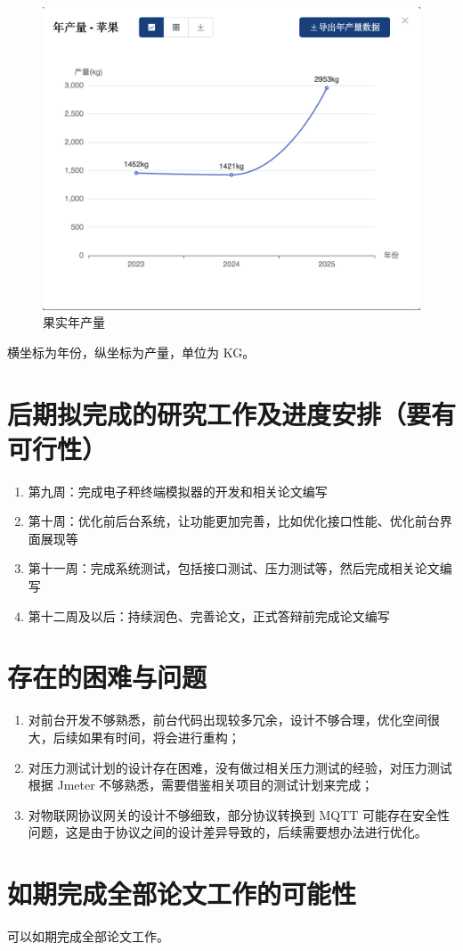 \documentclass{xduugmr}
\begin{document}
\begin{figure}[H]
    \centering
    \includegraphics[width=0.8\linewidth]{../result/果实年产量.png}
    \caption{果实年产量}
    \label{fig:果实年产量}
\end{figure}

横坐标为年份，纵坐标为产量，单位为 KG。

\section{后期拟完成的研究工作及进度安排（要有可行性）}

\begin{enumerate}
    \item 第九周：完成电子秤终端模拟器的开发和相关论文编写
    \item 第十周：优化前后台系统，让功能更加完善，比如优化接口性能、优化前台界面展现等
    \item 第十一周：完成系统测试，包括接口测试、压力测试等，然后完成相关论文编写
    \item 第十二周及以后：持续润色、完善论文，正式答辩前完成论文编写
\end{enumerate}

\section{存在的困难与问题}
\begin{enumerate}
    \item 对前台开发不够熟悉，前台代码出现较多冗余，设计不够合理，优化空间很大，后续如果有时间，将会进行重构；
    \item 对压力测试计划的设计存在困难，没有做过相关压力测试的经验，对压力测试根据 Jmeter 不够熟悉，需要借鉴相关项目的测试计划来完成；
    \item 对物联网协议网关的设计不够细致，部分协议转换到 MQTT 可能存在安全性问题，这是由于协议之间的设计差异导致的，后续需要想办法进行优化。
\end{enumerate}

\section{如期完成全部论文工作的可能性}
可以如期完成全部论文工作。
\end{document}
